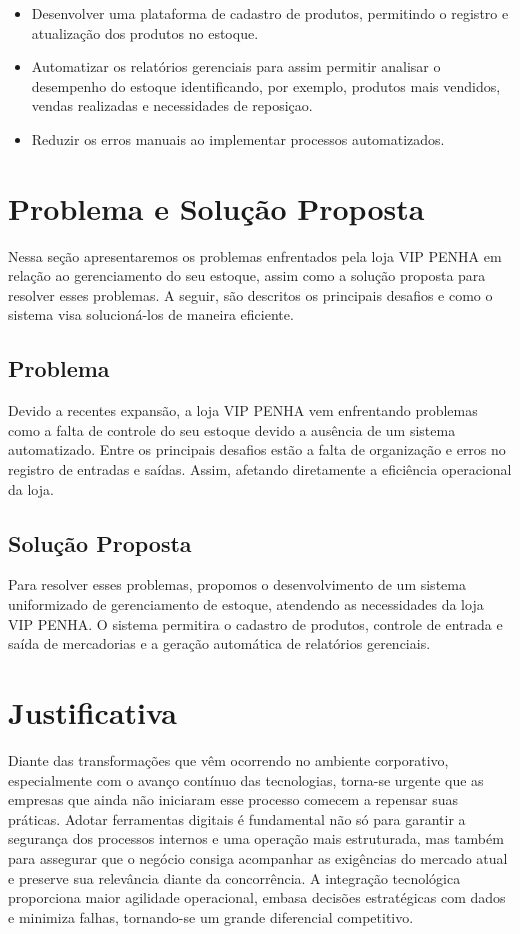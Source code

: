 \documentclass[
	12pt,				%
	openright,			%
	twoside,			%
	a4paper,			%
	english,			%
	french,				%
	spanish,			%
	brazil				%
	]{abntex2}
\begin{document}
\begin{itemize}
    \item Desenvolver uma plataforma de cadastro de produtos, permitindo o registro e atualização dos produtos no estoque.
    \item Automatizar os relatórios gerenciais para assim permitir analisar o desempenho do estoque identificando, por exemplo, produtos mais vendidos, vendas realizadas e necessidades de reposiçao.
    \item Reduzir os erros manuais ao implementar processos automatizados.
\end{itemize}

\section{Problema e Solução Proposta}

Nessa seção apresentaremos os problemas enfrentados pela loja VIP PENHA em relação ao gerenciamento do seu estoque, assim como a solução proposta para resolver esses problemas. A seguir, são descritos os principais desafios e como o sistema visa solucioná-los de maneira eficiente.

\subsection{Problema}

Devido a recentes expansão, a loja VIP PENHA vem enfrentando problemas como a falta de controle do seu estoque devido a ausência de um sistema automatizado. Entre os principais desafios estão a falta de organização e erros no registro de entradas e saídas. Assim, afetando diretamente a eficiência operacional da loja.

\subsection{Solução Proposta}

Para resolver esses problemas, propomos o desenvolvimento de um sistema uniformizado de gerenciamento de estoque, atendendo as necessidades da loja VIP PENHA. O sistema permitira o cadastro de produtos, controle de entrada e saída de mercadorias e a geração automática de relatórios gerenciais.  

\section{Justificativa}
Diante das transformações que vêm ocorrendo no ambiente corporativo, especialmente com o avanço contínuo das tecnologias, torna-se urgente que as empresas que ainda não iniciaram esse processo comecem a repensar suas práticas. Adotar ferramentas digitais é fundamental não só para garantir a segurança dos processos internos e uma operação mais estruturada, mas também para assegurar que o negócio consiga acompanhar as exigências do mercado atual e preserve sua relevância diante da concorrência. A integração tecnológica proporciona maior agilidade operacional, embasa decisões estratégicas com dados e minimiza falhas, tornando-se um grande diferencial competitivo.
\end{document}

